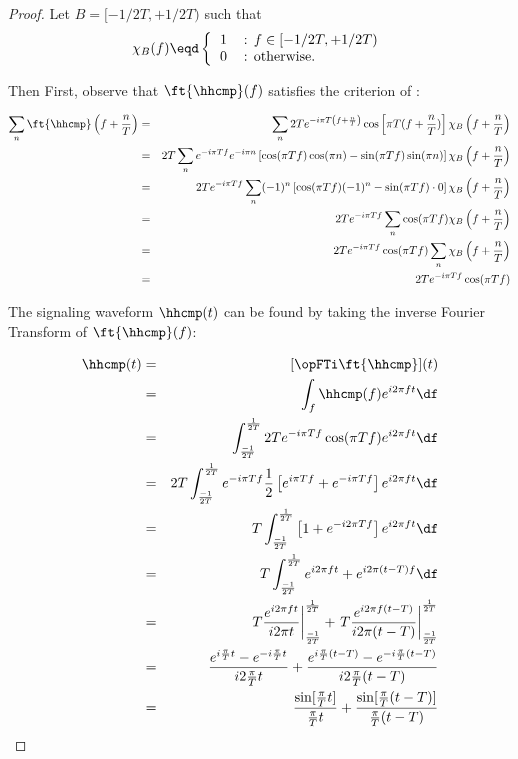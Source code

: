 \begin{proof}
Let $B=[-1/2T, +1/2T)$ such that
\[
\chi_B(f) \eqd
\left\{
\begin{tabular}{llll}
   1 & : $f\in [-1/2T, +1/2T)$ \\
   0 & : otherwise.
\end{tabular}
\right.
\]

Then
First, observe that $\ft{\hhcmp}(f)$ satisfies
the criterion of :

\begin{eqnarray*}
   \sum_n \ft{\hhcmp}\left( f + \frac{n}{T} \right)
     &=& \sum_n 2T e^{-i\pi T\left(f+\frac{n}{T}\right)}
         \cos\left[\pi T(f+\frac{n}{T})\right]
         \chi_B\left(f+\frac{n}{T}\right)
   \\&=& 2T \sum_n
         e^{-i\pi Tf}
         e^{-i\pi n }
         \left[\cos(\pi Tf)\cos(\pi n)-\sin(\pi Tf)\sin(\pi n) \right]
         \chi_B\left(f+\frac{n}{T}\right)
   \\&=& 2T e^{-i\pi Tf} \sum_n
         (-1)^n
         \left[\cos(\pi Tf)(-1)^n -\sin(\pi Tf)\cdot0 \right]
         \chi_B\left(f+\frac{n}{T}\right)
   \\&=& 2T e^{-i\pi Tf} \sum_n
         \cos(\pi Tf)
         \chi_B\left(f+\frac{n}{T}\right)
   \\&=& 2T e^{-i\pi Tf} \cos(\pi Tf) \sum_n
         \chi_B\left(f+\frac{n}{T}\right)
   \\&=& 2T e^{-i\pi Tf} \cos(\pi Tf)
\end{eqnarray*}

The signaling waveform $\hhcmp(t)$ can be found by taking
the inverse Fourier Transform of $\ft{\hhcmp}(f)$:

\begin{eqnarray*}
   \hhcmp(t)
     &=& [\opFTi\ft{\hhcmp}](t)
   \\&=& \int_f \hhcmp(f) e^{i2\pi ft} \df
   \\&=& \int_\frac{-1}{2T}^\frac{1}{2T}
         2T e^{-i\pi Tf} \cos(\pi Tf) e^{i2\pi ft} \df
   \\&=& 2T\int_\frac{-1}{2T}^\frac{1}{2T}
         e^{-i\pi Tf}
         \frac{1}{2}\left[ e^{i\pi Tf} + e^{-i\pi Tf}  \right]
         e^{i2\pi ft} \df
   \\&=& T\int_\frac{-1}{2T}^\frac{1}{2T}
         \left[ 1 + e^{-i2\pi Tf}  \right]
         e^{i2\pi ft} \df
   \\&=& T\int_\frac{-1}{2T}^\frac{1}{2T}
         e^{i2\pi ft} + e^{i2\pi(t-T)f} \df
   \\&=& \left. T\frac{e^{i2\pi ft    }}{i2\pi t    } \right|_\frac{-1}{2T}^\frac{1}{2T}  +
         \left. T\frac{e^{i2\pi f(t-T)}}{i2\pi (t-T)} \right|_\frac{-1}{2T}^\frac{1}{2T}
   \\&=& \frac{e^{i\frac{\pi}{T}t    }-e^{-i\frac{\pi}{T}t    }}{i2\frac{\pi}{T} t    }   +
         \frac{e^{i\frac{\pi}{T}(t-T)}-e^{-i\frac{\pi}{T}(t-T)}}{i2\frac{\pi}{T} (t-T)}
   \\&=& \frac{\sin[\frac{\pi}{T}t]    }{\frac{\pi}{T} t    }   +
         \frac{\sin[\frac{\pi}{T}(t-T)]}{\frac{\pi}{T} (t-T)}
\end{eqnarray*}
\end{proof}



